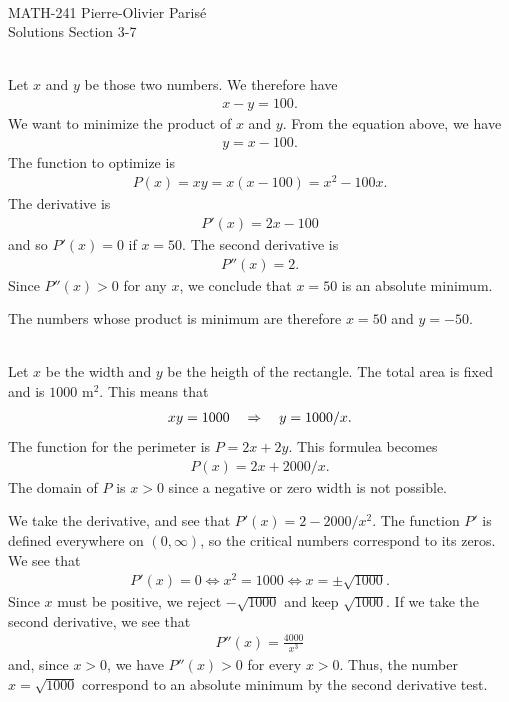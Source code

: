 


	\noindent \hrulefill \\
	MATH-241 \hfill Pierre-Olivier Paris{\'e}\\
	Solutions Section 3-7 \hfill \semester \\\vspace*{-1cm}
	
	\noindent\hrulefill
	
	\spc
	
	\\
	Let $x$ and $y$ be those two numbers. We therefore have
		\begin{align*}
		x - y = 100 .
		\end{align*}		
	We want to minimize the product of $x$ and $y$. From the equation above, we have
		\begin{align*}
		y = x - 100 .
		\end{align*}
	The function to optimize is
		\begin{align*}
		P(x ) = xy = x (x - 100) = x^2 - 100x .
		\end{align*}	
	The derivative is 
		\begin{align*}
		P'(x) = 2x - 100
		\end{align*}
	and so $P'(x) = 0$ if $x = 50$. The second derivative is
		\begin{align*}
		P''(x) = 2 .
		\end{align*}		
	Since $P''(x) > 0$ for any $x$, we conclude that $x = 50$ is an absolute minimum. 
	
	The numbers whose product is minimum are therefore $x = 50$ and $y = -50$.		
	
	\spc
	
	\\
	Let $x$ be the width and $y$ be the heigth of the rectangle. The total area is fixed and is $1000\text{ m}^2$. This means that
		\begin{align*}
		xy = 1000 \quad \Rightarrow \quad y = 1000/x .
		\end{align*}
	The function for the perimeter is $P = 2x + 2y$. This formulea becomes 
		\begin{align*}
		P(x) = 2x + 2000/x .
		\end{align*}
	The domain of $P$ is $x > 0$ since a negative or zero width is not possible.
	
	We take the derivative, and see that $P'(x) = 2 - 2000/x^2$. The function $P'$ is defined everywhere on $(0, \infty )$, so the critical numbers correspond to its zeros. We see that
		\begin{align*}
		P'(x) = 0 \iff x^2 = 1000 \iff x = \pm \sqrt{1000} .
		\end{align*}
	Since $x$ must be positive, we reject $-\sqrt{1000}$ and keep $\sqrt{1000}$. If we take the second derivative, we see that 
		\begin{align*}
		P''(x) = \frac{4000}{x^3}
		\end{align*}
	and, since $x > 0$, we have $P''(x) > 0$ for every $x > 0$. Thus, the number $x = \sqrt{1000}$ correspond to an absolute minimum by the second derivative test. 
	

